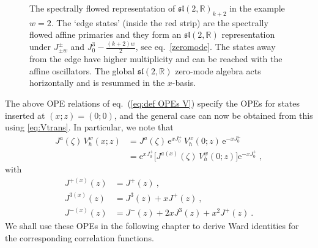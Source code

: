 \documentclass[12pt,a4paper]{article}
\begin{document}
\begin{figure}
\begin{center}
\end{center}
\caption{The spectrally flowed representation of $\mathfrak{sl}(2,\mathds{R})_{k+2}$ in the example $w=2$. The `edge states' (inside the red strip) are the spectrally flowed affine primaries and they form an $\mathfrak{sl}(2,\mathds{R})$ representation under $J^\pm_{\pm w}$ and $J^3_0-\frac{(k+2)w}{2}$, see eq.~\eqref{zeromode}. The states away from the edge have higher multiplicity and can be reached with the affine oscillators. The global $\mathfrak{sl}(2,\mathds{R})$ zero-mode algebra acts horizontally and is resummed in the $x$-basis.}\label{fig:module}
\end{figure}
\smallskip

The above OPE relations of eq.~(\ref{eq:def OPEs V}) specify the OPEs for states inserted at $(x;z)=(0;0)$, and the general case can now be obtained from this using \eqref{eq:Vtrans}. In particular, we note that 
\begin{align}\label{eq:transprop}
J^a(\zeta) \, V^{w}_h(x;z) & = J^a(\zeta) \, \mathrm{e}^{x J_0^+} \, V_h^w(0;z)\, \mathrm{e}^{- x J_0^+} \nonumber \\
& = \mathrm{e}^{x J_0^+} \bigl[ J^{a (x)}(\zeta) \, V_h^w(0;z)\bigr] \mathrm{e}^{- x J_0^+} \ , 
\end{align}
with
\begin{subequations}\label{eq:Jxshift}
\begin{align}
J^{+(x)}(z) & = J^+(z) \ , \label{eq:J+x}\\
J^{3(x)}(z) & = J^{3}(z) + x J^+(z) \ ,\label{eq:J3x}  \\ 
J^{-(x)}(z) & = J^-(z) + 2 x J^3(z) + x^2 J^+(z) \ . \label{eq:J-x}
\end{align}
\end{subequations}
We shall use these OPEs in the following chapter to derive Ward identities for the corresponding correlation functions. 
\end{document}
